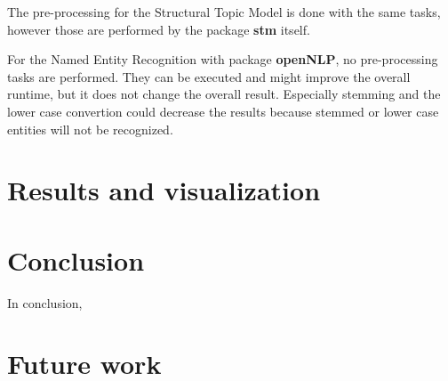 \documentclass[10pt,a4paper]{article}
\begin{document}
	The pre-processing for the Structural Topic Model is done with the same tasks, however those are performed by the package \textbf{stm} itself.
	
	For the Named Entity Recognition with package \textbf{openNLP}, no pre-processing tasks are performed. They can be executed and might improve the overall runtime, but it does not change the overall result. Especially stemming and the lower case convertion could decrease the results because stemmed or lower case entities will not be recognized.

	
	
	\section{Results and visualization}
	
	
	\section{Conclusion}
	In conclusion, 

	\section{Future work}
\end{document}

